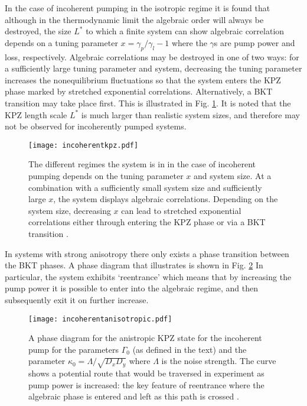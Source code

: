 \documentclass[letterpaper, 10 pt, conference]{IEEEtran}  %
\newcommand{\fig}[1]{Fig. #1}
\begin{document}
In the case of incoherent pumping in the isotropic regime it is found \cite{2015PhRvX...5a1017A} that although in the thermodynamic limit the algebraic order will always be destroyed, the size $L^*$ to which a finite system can show algebraic correlation depends on a tuning parameter $x= \gamma_p / \gamma_l -1$ where the $\gamma$s are pump power and loss, respectively. 
Algebraic correlations may be destroyed in one of two ways: for a sufficiently large tuning parameter and system, decreasing the tuning parameter increases the nonequilibrium fluctuations so that the system enters the KPZ phase marked by stretched exponential correlations. 
Alternatively, a BKT transition may take place first. 
This is illustrated in \fig{\ref{fig:incoherentkpz}}.
It is noted that the KPZ length scale $L^*$ is much larger than realistic system sizes, and therefore may not be observed for incoherently pumped systems. 

\begin{figure}[htbp!]
	\centering
	\texttt{[image: incoherentkpz.pdf]}
	\caption{The different regimes the system is in in the case of incoherent pumping depends on the tuning parameter $x$ and system size. At a combination with a sufficiently small system size and sufficiently large $x$, the system displays algebraic correlations. Depending on the system size, decreasing $x$ can lead to stretched exponential correlations either through entering the KPZ phase or via a BKT transition \cite{2015PhRvX...5a1017A}.}
	\label{fig:incoherentkpz}
\end{figure}

In systems with strong anisotropy there only exists a phase transition between the BKT phases.
A phase diagram that illustrates is shown in \fig{\ref{fig:incoherentanisotropic}}
In particular, the system exhibits `reentrance' which means that by increasing the pump power it is possible to enter into the algebraic regime, and then subsequently exit it on further increase.
\begin{figure}[htbp!]
	\centering
	\texttt{[image: incoherentanisotropic.pdf]}
	\caption{A phase diagram for the anistropic KPZ state for the incoherent pump for the parameters $\Gamma_0$ (as defined in the text) and the parameter $\kappa_0 = \Lambda/\sqrt{D_x D_y}$ where $\Lambda$ is the noise strength. 
	The curve shows a potential route that would be traversed in experiment as pump power is increased: the key feature of reentrance where the algebraic phase is entered and left as this path is crossed \cite{2015PhRvX...5a1017A}.}
	\label{fig:incoherentanisotropic}
\end{figure}
\end{document}
